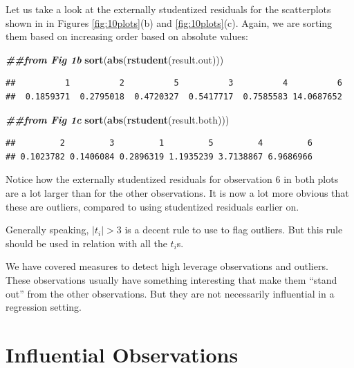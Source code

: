 \documentclass[
]{book}
\newenvironment{Shaded}{\begin{snugshade}}{\end{snugshade}}
\newcommand{\DocumentationTok}[1]{\textcolor[rgb]{0.56,0.35,0.01}{\textbf{\textit{#1}}}}
\newcommand{\FunctionTok}[1]{\textcolor[rgb]{0.13,0.29,0.53}{\textbf{#1}}}
\newcommand{\NormalTok}[1]{#1}
\begin{document}
Let us take a look at the externally studentized residuals for the scatterplots shown in in Figures \ref{fig:10plots}(b) and \ref{fig:10plots}(c). Again, we are sorting them based on increasing order based on absolute values:

\begin{Shaded}
\begin{Highlighting}[]
\DocumentationTok{\#\#from Fig 1b}
\FunctionTok{sort}\NormalTok{(}\FunctionTok{abs}\NormalTok{(}\FunctionTok{rstudent}\NormalTok{(result.out)))}
\end{Highlighting}
\end{Shaded}

\begin{verbatim}
##          1          2          5          3          4          6 
##  0.1859371  0.2795018  0.4720327  0.5417717  0.7585583 14.0687652
\end{verbatim}

\begin{Shaded}
\begin{Highlighting}[]
\DocumentationTok{\#\#from Fig 1c}
\FunctionTok{sort}\NormalTok{(}\FunctionTok{abs}\NormalTok{(}\FunctionTok{rstudent}\NormalTok{(result.both)))}
\end{Highlighting}
\end{Shaded}

\begin{verbatim}
##         2         3         1         5         4         6 
## 0.1023782 0.1406084 0.2896319 1.1935239 3.7138867 6.9686966
\end{verbatim}

Notice how the externally studentized residuals for observation 6 in both plots are a lot larger than for the other observations. It is now a lot more obvious that these are outliers, compared to using studentized residuals earlier on.

Generally speaking, \(|t_i| > 3\) is a decent rule to use to flag outliers. But this rule should be used in relation with all the \(t_i\)s.

We have covered measures to detect high leverage observations and outliers. These observations usually have something interesting that make them ``stand out'' from the other observations. But they are not necessarily influential in a regression setting.

\hypertarget{influential-observations}{%
\section{Influential Observations}\label{influential-observations}}
\end{document}
